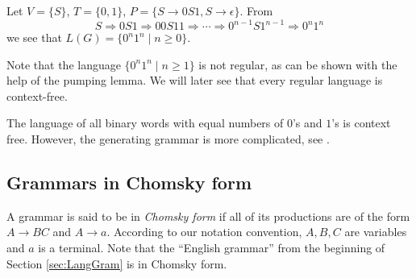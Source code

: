 \begin{page}
\setcounter{section}{5}
\setcounter{subsection}{1}
\setcounter{dfn}{4}
\label{portion:1218}

\begin{exl}
\label{exl:0n1n}
Let $V = \{S\}$, $T = \{0, 1\}$, $P = \{S \to 0S1, S \to \epsilon\}$.
From
\[
S \Rightarrow 0S1 \Rightarrow 00S11 \Rightarrow \cdots \Rightarrow 0^{n-1}S1^{n-1} \Rightarrow 0^n1^n
\]
we see that $L(G) = \{0^n1^n \mid n \ge 0\}$.
\end{exl}

\end{page}

\begin{page}
\setcounter{section}{5}
\setcounter{subsection}{1}
\setcounter{dfn}{4}
\label{portion:1219}


Note that the language $\{0^n1^n \mid n \ge 1\}$ is not regular, as can be shown with the help of the pumping lemma.
We will later see that every regular language is context-free.


\end{page}

\begin{page}
\setcounter{section}{5}
\setcounter{subsection}{1}
\setcounter{dfn}{5}
\label{portion:1221}

\begin{exl}
The language of all binary words with equal numbers of $0$'s and $1$'s is context free.
However, the generating grammar is more complicated, see \cite[Example 4.3]{HU79}.
\end{exl}

\end{page}

\begin{page}
\setcounter{section}{5}
\setcounter{subsection}{2}
\setcounter{dfn}{5}
\label{portion:1224}

\subsection{Grammars in Chomsky form}
A grammar is said to be in \emph{Chomsky form} if all of its productions are of the form $A \to BC$ and $A \to a$.
According to our notation convention, $A, B, C$ are variables and $a$ is a terminal.
Note that the ``English grammar'' from the beginning of Section \ref{sec:LangGram} is in Chomsky form.


\end{page}

